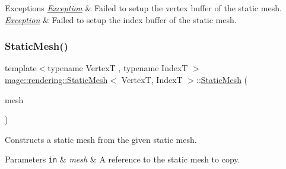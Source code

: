 \begin{DoxyExceptions}{Exceptions}
{\em \mbox{\hyperlink{classmage_1_1_exception}{Exception}}} & Failed to setup the vertex buffer of the static mesh. \\
\hline
{\em \mbox{\hyperlink{classmage_1_1_exception}{Exception}}} & Failed to setup the index buffer of the static mesh. \\
\hline
\end{DoxyExceptions}
\mbox{\label{classmage_1_1rendering_1_1_static_mesh_a0e824924504f75bbfa578caf0637dd2a}} 
\subsubsection{\texorpdfstring{Static\+Mesh()}{StaticMesh()}\hspace{0.1cm}{\footnotesize\ttfamily [2/3]}}
{\footnotesize\ttfamily template$<$typename VertexT , typename IndexT $>$ \\
\mbox{\hyperlink{classmage_1_1rendering_1_1_static_mesh}{mage\+::rendering\+::\+Static\+Mesh}}$<$ VertexT, IndexT $>$\+::\mbox{\hyperlink{classmage_1_1rendering_1_1_static_mesh}{Static\+Mesh}} (\begin{DoxyParamCaption}\item[{const \mbox{\hyperlink{classmage_1_1rendering_1_1_static_mesh}{Static\+Mesh}}$<$ VertexT, IndexT $>$ \&}]{mesh }\end{DoxyParamCaption})\hspace{0.3cm}{\ttfamily [delete]}}

Constructs a static mesh from the given static mesh.


\begin{DoxyParams}[1]{Parameters}
\mbox{\tt in}  & {\em mesh} & A reference to the static mesh to copy. \\
\hline
\end{DoxyParams}
\mbox{\label{classmage_1_1rendering_1_1_static_mesh_a7cf948089fc5ceae5284bab45f216a75}} 
